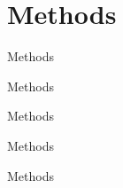 \documentclass[aspectratio=169,xcolor=dvipsnames]{beamer}
\begin{document}



 \section{Methods}

\begin{frame}{Methods}


\end{frame}


\begin{frame}{Methods}


\end{frame}


\begin{frame}{Methods}


\end{frame}


\begin{frame}{Methods}


\end{frame}


\begin{frame}{Methods}


\end{frame}




\end{document}
